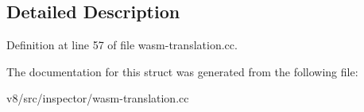 \subsection{Detailed Description}


Definition at line 57 of file wasm-\/translation.\+cc.



The documentation for this struct was generated from the following file\+:\begin{DoxyCompactItemize}
\item 
v8/src/inspector/wasm-\/translation.\+cc\end{DoxyCompactItemize}
